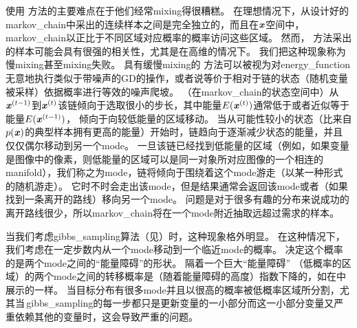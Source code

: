使用\,\,方法的主要难点在于他们经常\gls{mixing}得很糟糕。
在理想情况下，从设计好的\gls{markov_chain}中采出的连续样本之间是完全独立的，而且在$\boldsymbol{\mathit{x}}$空间中，\gls{markov_chain}以正比于不同区域对应概率的概率访问这些区域。
然而，\,\,方法采出的样本可能会具有很强的相关性，尤其是在高维的情况下。
我们把这种现象称为慢\gls{mixing}甚至\gls{mixing}失败。
具有缓慢\gls{mixing}的\,\,方法可以被视为对\gls{energy_function}无意地执行类似于带噪声的\gls{GD}的操作，或者说等价于相对于链的状态（随机变量被采样）依据概率进行等效的噪声爬坡。
（在\gls{markov_chain}的状态空间中）从$\boldsymbol{\mathit{x}}^{(t-1)}$到$\boldsymbol{\mathit{x}}^{(t)}$该链倾向于选取很小的步长，其中能量$E(\boldsymbol{\mathit{x}}^{(t)})$通常低于或者近似等于能量$E(\boldsymbol{\mathit{x}}^{(t-1)})$，
倾向于向较低能量的区域移动。
当从可能性较小的状态（比来自$p(\boldsymbol{\mathit{x}})$的典型样本拥有更高的能量）开始时，链趋向于逐渐减少状态的能量，并且仅仅偶尔移动到另一个\gls{mode}。 %
一旦该链已经找到低能量的区域（例如，如果变量是图像中的像素，则低能量的区域可以是同一对象所对应图像的一个相连的\gls{manifold}），我们称之为\gls{mode}，链将倾向于围绕着这个\gls{mode}游走（以某一种形式的随机游走）。 %
它时不时会走出该\gls{mode}，但是结果通常会返回该\gls{mode}或者（如果找到一条离开的路线）移向另一个\gls{mode}。
问题是对于很多有趣的分布来说成功的离开路线很少，所以\gls{markov_chain}将在一个\gls{mode}附近抽取远超过需求的样本。


当我们考虑\gls{gibbs_sampling}算法（见）时，这种现象格外明显。
在这种情况下，我们考虑在一定步数内从一个\gls{mode}移动到一个临近\gls{mode}的概率。
决定这个概率的是两个\gls{mode}之间的``能量障碍''的形状。
隔着一个巨大``能量障碍'' （低概率的区域）的两个\gls{mode}之间的转移概率是（随着能量障碍的高度）指数下降的，如在中展示的一样。
当目标分布有很多\gls{mode}并且以很高的概率被低概率区域所分割，尤其当\,\gls{gibbs_sampling}的每一步都只是更新变量的一小部分而这一小部分变量又严重依赖其他的变量时，这会导致严重的问题。 


